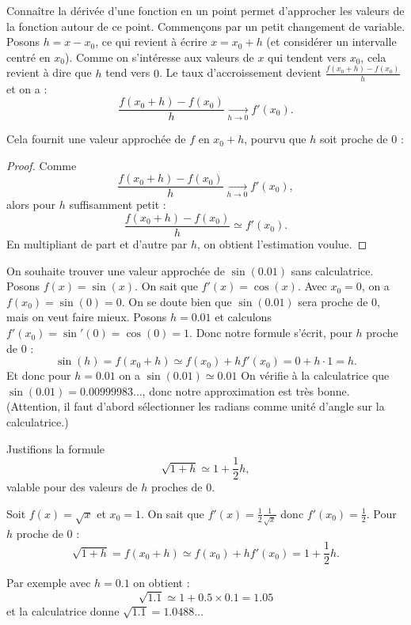 \documentclass[11pt,class=report,crop=false]{standalone}
\begin{document}
Connaître la dérivée d'une fonction en un point permet d'approcher les valeurs de la fonction autour de ce point.
Commençons par un petit changement de variable. Posons $h=x - x_0$, ce qui revient à écrire 
$x = x_0 + h$ (et considérer un intervalle centré en $x_0$). Comme on s'intéresse aux valeurs de $x$ qui tendent vers $x_0$, cela revient à dire que $h$ tend vers $0$.
Le taux d'accroissement devient $\frac{f(x_0+h)-f(x_0)}{h}$ et on a :
$$\frac{f(x_0+h)-f(x_0)}{h} \xrightarrow[h \to 0]{} f'(x_0).$$

Cela fournit une valeur approchée de $f$ en $x_0+h$, pourvu que $h$ soit proche de $0$ :

\begin{proof}
Comme 
$$\frac{f(x_0+h)-f(x_0)}{h} \xrightarrow[h \to 0]{}  f'(x_0),$$
alors pour $h$ suffisamment petit :
$$\frac{f(x_0+h)-f(x_0)}{h} \simeq f'(x_0).$$
En multipliant de part et d'autre par $h$, on obtient l'estimation voulue.
\end{proof}

\begin{exemple}
On souhaite trouver une valeur approchée de $\sin(0.01)$ sans calculatrice.
Posons $f(x) = \sin(x)$. On sait que $f'(x)=\cos(x)$.
Avec $x_0=0$, on a $f(x_0) = \sin(0) = 0$. On se doute bien que $\sin(0.01)$ sera proche de $0$, mais on veut faire mieux.
Posons $h=0.01$ et calculons $f'(x_0) = \sin'(0) = \cos(0) = 1$.
Donc notre formule s'écrit, pour $h$ proche de $0$ :
$$\sin(h) = f(x_0+h) \simeq f(x_0) + h f'(x_0) = 0 + h \cdot 1 = h.$$
Et donc pour $h=0.01$ on a 
$\sin(0.01) \simeq 0.01$
On vérifie à la calculatrice que $\sin(0.01) = 0.00999983\ldots$, donc notre approximation est très bonne. (Attention, il faut d'abord sélectionner les radians comme unité d'angle sur la calculatrice.)
\end{exemple}

\begin{exemple}
Justifions la formule 
$$\sqrt{1+h} \simeq 1+ \frac 12 h,$$
valable pour des valeurs de $h$ proches de $0$.

Soit $f(x) = \sqrt{x}$ et $x_0=1$. On sait que $f'(x) = \frac12 \frac{1}{\sqrt{x}}$ donc $f'(x_0) = \frac12$.
Pour $h$ proche de $0$ :
$$\sqrt{1+h} = f(x_0+h) \simeq f(x_0) + h f'(x_0) = 1 + \frac12 h.$$

Par exemple avec $h=0.1$ on obtient :
$$\sqrt{1.1} \simeq 1 + 0.5 \times 0.1 = 1.05$$
et la calculatrice donne $\sqrt{1.1} = 1.0488\ldots$
\end{exemple}
\end{document}
